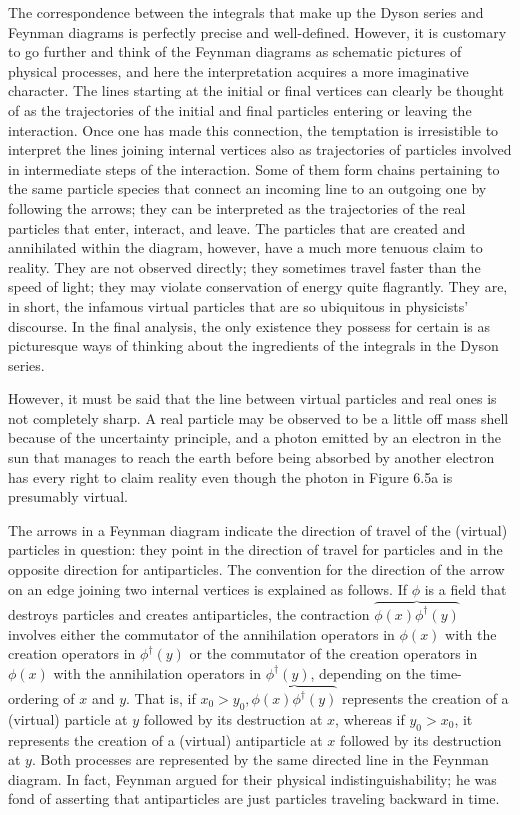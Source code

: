 \documentclass[10pt, letterpaper]{article}
\begin{document}
The correspondence between the integrals that make up the Dyson series and Feynman diagrams is perfectly precise and well-defined. However, it is customary to go further and think of the Feynman diagrams as schematic pictures of physical processes, and here the interpretation acquires a more imaginative character. The lines starting at the initial or final vertices can clearly be thought of as the trajectories of the initial and final particles entering or leaving the interaction. Once one has made this connection, the temptation is irresistible to interpret the lines joining internal vertices also as trajectories of particles involved in intermediate steps of the interaction. Some of them form chains pertaining to the same particle species that connect an incoming line to an outgoing one by following the arrows; they can be interpreted as the trajectories of the real particles that enter, interact, and leave. The particles that are created and annihilated within the diagram, however, have a much more tenuous claim to reality. They are not observed directly; they sometimes travel faster than the speed of light; they may violate conservation of energy quite flagrantly. They are, in short, the infamous virtual particles that are so ubiquitous in physicists' discourse. In the final analysis, the only existence they possess for certain is as picturesque ways of thinking about the ingredients of the integrals in the Dyson series.

However, it must be said that the line between virtual particles and real ones is not completely sharp. A real particle may be observed to be a little off mass shell because of the uncertainty principle, and a photon emitted by an electron in the\\
sun that manages to reach the earth before being absorbed by another electron has every right to claim reality even though the photon in Figure 6.5a is presumably virtual.

The arrows in a Feynman diagram indicate the direction of travel of the (virtual) particles in question: they point in the direction of travel for particles and in the opposite direction for antiparticles. The convention for the direction of the arrow on an edge joining two internal vertices is explained as follows. If $\phi$ is a field that destroys particles and creates antiparticles, the contraction $\overbrace{\phi(x) \phi^{\dagger}(y)}$ involves either the commutator of the annihilation operators in $\phi(x)$ with the creation operators in $\phi^{\dagger}(y)$ or the commutator of the creation operators in $\phi(x)$ with the annihilation operators in $\phi^{\dagger}(y)$, depending on the time-ordering of $x$ and $y$. That is, if $x_{0}>y_{0}, \overbrace{\phi(x) \phi^{\dagger}(y)}$ represents the creation of a (virtual) particle at $y$ followed by its destruction at $x$, whereas if $y_{0}>x_{0}$, it represents the creation of a (virtual) antiparticle at $x$ followed by its destruction at $y$. Both processes are represented by the same directed line in the Feynman diagram. In fact, Feynman argued for their physical indistinguishability; he was fond of asserting that antiparticles are just particles traveling backward in time.
\end{document}

